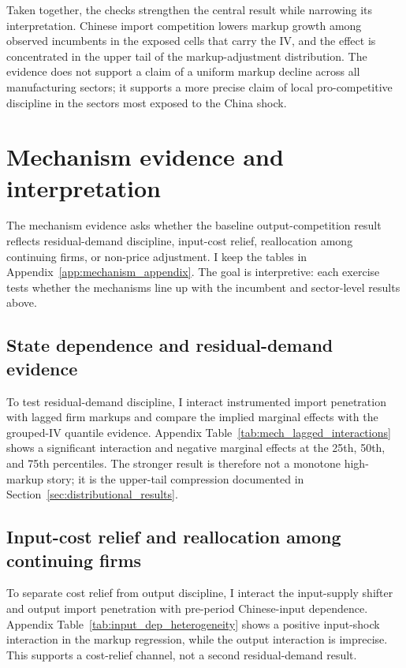 ﻿\documentclass[12pt]{article}
\begin{document}
Taken together, the checks strengthen the central result while narrowing its interpretation. Chinese import competition lowers markup growth among observed incumbents in the exposed cells that carry the IV, and the effect is concentrated in the upper tail of the markup-adjustment distribution. The evidence does not support a claim of a uniform markup decline across all manufacturing sectors; it supports a more precise claim of local pro-competitive discipline in the sectors most exposed to the China shock.


\section{Mechanism evidence and interpretation}
\label{sec:input_extension}

The mechanism evidence asks whether the baseline output-competition result reflects residual-demand discipline, input-cost relief, reallocation among continuing firms, or non-price adjustment. I keep the tables in Appendix~\ref{app:mechanism_appendix}. The goal is interpretive: each exercise tests whether the mechanisms line up with the incumbent and sector-level results above.

\subsection{State dependence and residual-demand evidence}

To test residual-demand discipline, I interact instrumented import penetration with lagged firm markups and compare the implied marginal effects with the grouped-IV quantile evidence. Appendix Table~\ref{tab:mech_lagged_interactions} shows a significant interaction and negative marginal effects at the 25th, 50th, and 75th percentiles. The stronger result is therefore not a monotone high-markup story; it is the upper-tail compression documented in Section~\ref{sec:distributional_results}.

\subsection{Input-cost relief and reallocation among continuing firms}

To separate cost relief from output discipline, I interact the input-supply shifter and output import penetration with pre-period Chinese-input dependence. Appendix Table~\ref{tab:input_dep_heterogeneity} shows a positive input-shock interaction in the markup regression, while the output interaction is imprecise. This supports a cost-relief channel, not a second residual-demand result.
\end{document}
